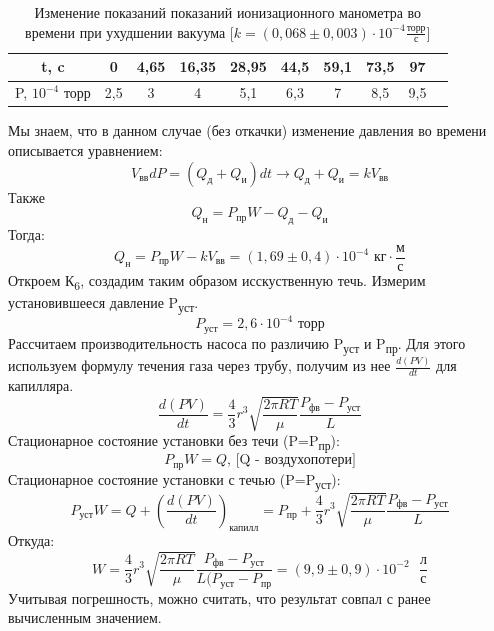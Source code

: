 \documentclass[a4paper]{article}
\begin{document}
	\begin{table}[h!]
 		\centering
    	\begin{tabular}{|c|c|c|c|c|c|c|c|c|c|}
    		\hline
    		t, c & 0 & 4,65 & 16,35 & 28,95 & 44,5 & 59,1 & 73,5 & 97 \\
    		\hline
    		P, $10^{-4}$ торр & 2,5 & 3 & 4 & 5,1 & 6,3 & 7 & 8,5 & 9,5\\
    		\hline
    	\end{tabular}
  		\caption{Изменение показаний показаний ионизационного манометра во времени при ухудшении вакуума [$k=(0,068\pm 0,003)\cdot 10^{-4} \frac{\text{торр}}{\text{с}}]$}
	\end{table}
	Мы знаем, что в данном случае (без откачки) изменение давления во времени описывается уравнением:
	\begin{equation}
	V_\text{вв}dP=(Q_\text{д}+Q_\text{и})dt \rightarrow Q_\text{д}+Q_\text{и} = kV_\text{вв}
	\end{equation}
	Также
	\begin{equation}
	Q_\text{н}=P_\text{пр}W-Q_\text{д}-Q_\text{и}
	\end{equation}
	Тогда:
	\begin{equation}
	Q_\text{н}=P_\text{пр}W-kV_\text{вв}=(1,69\pm 0,4)\cdot 10^{-4} \text{ кг}\cdot \frac{\text{м}}{\text{с}}
	\end{equation}
	Откроем К\textsubscript{6}, создадим таким образом исскуственную течь. Измерим установившееся давление P\textsubscript{уст}.
	\begin{equation}
	P_\text{уст}=2,6\cdot 10^{-4} \text{ торр}
	\end{equation}
	Рассчитаем производительность насоса по различию P\textsubscript{уст} и P\textsubscript{пр}. Для этого используем формулу течения газа через трубу, получим из нее $\frac{d(PV)}{dt}$ для капилляра.
	\begin{equation}
	\frac{d(PV)}{dt}=\frac{4}{3}r^3\sqrt{\frac{2\pi RT}{\mu}}\frac{P_\text{фв}-P_\text{уст}}{L}
	\end{equation}
	Стационарное состояние установки без течи (P=P\textsubscript{пр}):
	\begin{equation}
	P_\text{пр}W=Q\text{, [Q - воздухопотери]}
	\end{equation}
	Стационарное состояние установки с течью (P=P\textsubscript{уст}):
	\begin{equation}
	P_\text{уст}W=Q+\left(\frac{d(PV)}{dt}\right)_\text{капилл}=P_\text{пр}+\frac{4}{3}r^3\sqrt{\frac{2\pi RT}{\mu}}\frac{P_\text{фв}-P_\text{уст}}{L}
	\end{equation}
	Откуда:
	\begin{equation}
	W=\frac{4}{3}r^3\sqrt{\frac{2\pi RT}{\mu}}\frac{P_\text{фв}-P_\text{уст}}{L(P_\text{уст}-P_{пр}}=(9,9\pm 0,9)\cdot 10^{-2} \text{ } \frac{\text{л}}{\text{с}}
	\end{equation}
	Учитывая погрешность, можно считать, что результат совпал с ранее вычисленным значением.
	\newpage
\end{document}

